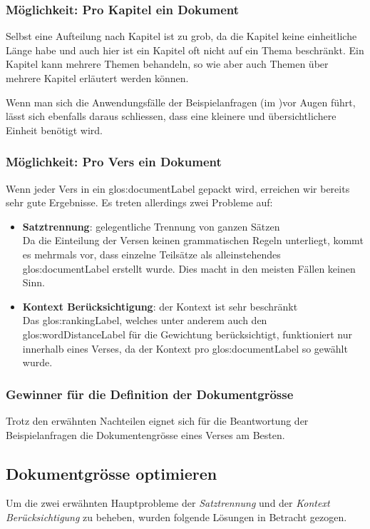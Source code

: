 \subsubsection{Möglichkeit: Pro Kapitel ein Dokument}
Selbst eine Aufteilung nach Kapitel ist zu grob, da die Kapitel keine einheitliche Länge habe und auch hier ist ein Kapitel oft nicht auf ein Thema beschränkt.
Ein Kapitel kann mehrere Themen behandeln, so wie aber auch Themen über mehrere Kapitel erläutert werden können.

Wenn man sich die Anwendungsfälle der Beispielanfragen (im )vor Augen führt, lässt sich ebenfalls daraus schliessen, dass eine kleinere und übersichtlichere Einheit benötigt wird.

\subsubsection{Möglichkeit: Pro Vers ein Dokument}
Wenn jeder Vers in ein \gls{glos:documentLabel} gepackt wird, erreichen wir bereits sehr gute Ergebnisse.
Es treten allerdings zwei Probleme auf:
\begin{itemize}
	\item \textbf{Satztrennung}: gelegentliche Trennung von ganzen Sätzen\\
	Da die Einteilung der Versen keinen grammatischen Regeln unterliegt, kommt es mehrmals vor, dass einzelne Teilsätze als alleinstehendes \gls{glos:documentLabel} erstellt wurde. Dies macht in den meisten Fällen keinen Sinn.
	\item \textbf{Kontext Berücksichtigung}: der Kontext ist sehr beschränkt\\
	Das \gls{glos:rankingLabel}, welches unter anderem auch den \gls{glos:wordDistanceLabel} für die Gewichtung berücksichtigt, funktioniert nur innerhalb eines Verses, da der Kontext pro \gls{glos:documentLabel} so gewählt wurde.
\end{itemize}

\subsubsection{Gewinner für die Definition der Dokumentgrösse}
Trotz den erwähnten Nachteilen eignet sich für die Beantwortung der Beispielanfragen die Dokumentengrösse eines Verses am Besten.


\subsection{Dokumentgrösse optimieren}
\label{sec:documentOptimazing}
Um die zwei erwähnten Hauptprobleme der \textit{Satztrennung} und der \textit{Kontext Berücksichtigung} zu beheben, wurden folgende Lösungen in Betracht gezogen.

